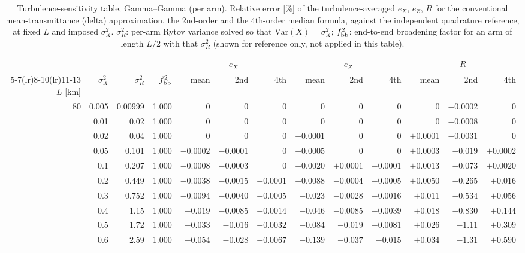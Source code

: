 \documentclass[11pt,a4paper]{article}
\begin{document}
\begin{table}[htbp]
\centering\scriptsize
\caption{Turbulence-sensitivity table, Gamma--Gamma (per arm). Relative error [\%] of the turbulence-averaged $e_X$, $e_Z$, $R$ for the conventional mean-transmittance (delta) approximation, the 2nd-order and the 4th-order median formula, against the independent quadrature reference, at fixed $L$ and imposed $\sigma_X^2$. $\sigma_R^2$: per-arm Rytov variance solved so that $\mathrm{Var}(X)=\sigma_X^2$; $f_{\rm bb}^2$: end-to-end broadening factor for an arm of length $L/2$ with that $\sigma_R^2$ (shown for reference only, not applied in this table).}
\label{tab:sens-GG}
\begin{tabular}{rrrrrrrrrrrrr}
\toprule
 & & & & \multicolumn{3}{c}{$e_X$} & \multicolumn{3}{c}{$e_Z$} & \multicolumn{3}{c}{$R$}\\
\cmidrule(lr){5-7}\cmidrule(lr){8-10}\cmidrule(lr){11-13}
$L$ [km] & $\sigma_X^2$ & $\sigma_R^2$ & $f_{\rm bb}^2$ & mean & 2nd & 4th & mean & 2nd & 4th & mean & 2nd & 4th\\
\midrule
80 & 0.005 & 0.00999 & 1.000 & $0$ & $0$ & $0$ & $0$ & $0$ & $0$ & $0$ & $-0.0002$ & $0$ \\
 & 0.01 & 0.02 & 1.000 & $0$ & $0$ & $0$ & $0$ & $0$ & $0$ & $0$ & $-0.0008$ & $0$ \\
 & 0.02 & 0.04 & 1.000 & $0$ & $0$ & $0$ & $-0.0001$ & $0$ & $0$ & $+0.0001$ & $-0.0031$ & $0$ \\
 & 0.05 & 0.101 & 1.000 & $-0.0002$ & $-0.0001$ & $0$ & $-0.0005$ & $0$ & $0$ & $+0.0003$ & $-0.019$ & $+0.0002$ \\
 & 0.1 & 0.207 & 1.000 & $-0.0008$ & $-0.0003$ & $0$ & $-0.0020$ & $+0.0001$ & $-0.0001$ & $+0.0013$ & $-0.073$ & $+0.0020$ \\
 & 0.2 & 0.449 & 1.000 & $-0.0038$ & $-0.0015$ & $-0.0001$ & $-0.0088$ & $-0.0004$ & $-0.0005$ & $+0.0050$ & $-0.265$ & $+0.016$ \\
 & 0.3 & 0.752 & 1.000 & $-0.0094$ & $-0.0040$ & $-0.0005$ & $-0.023$ & $-0.0028$ & $-0.0016$ & $+0.011$ & $-0.534$ & $+0.056$ \\
 & 0.4 & 1.15 & 1.000 & $-0.019$ & $-0.0085$ & $-0.0014$ & $-0.046$ & $-0.0085$ & $-0.0039$ & $+0.018$ & $-0.830$ & $+0.144$ \\
 & 0.5 & 1.72 & 1.000 & $-0.033$ & $-0.016$ & $-0.0032$ & $-0.084$ & $-0.019$ & $-0.0081$ & $+0.026$ & $-1.11$ & $+0.309$ \\
 & 0.6 & 2.59 & 1.000 & $-0.054$ & $-0.028$ & $-0.0067$ & $-0.139$ & $-0.037$ & $-0.015$ & $+0.034$ & $-1.31$ & $+0.590$ \\

\end{tabular}
\end{table}
\end{document}
